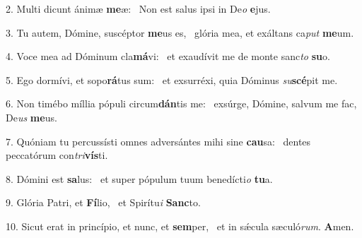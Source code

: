 2. Multi dicunt ánimæ \textbf{me}æ: \ast\  Non est salus ipsi in De\textit{o} \textbf{e}jus.\

3. Tu autem, Dómine, suscéptor \textbf{me}us es, \ast\  glória mea, et exáltans ca\textit{put} \textbf{me}um.\

4. Voce mea ad Dóminum cla\textbf{má}vi: \ast\  et exaudívit me de monte sanc\textit{to} \textbf{su}o.\

5. Ego dormívi, et sopo\textbf{rá}tus sum: \ast\  et exsurréxi, quia Dóminus \textit{su}\textbf{scé}pit me.\

6. Non timébo míllia pópuli circum\textbf{dán}tis me: \ast\  exsúrge, Dómine, salvum me fac, De\textit{us} \textbf{me}us.\

7. Quóniam tu percussísti omnes adversántes mihi sine \textbf{cau}sa: \ast\  dentes peccatórum con\textit{tri}\textbf{vís}ti.\

8. Dómini est \textbf{sa}lus: \ast\  et super pópulum tuum benedícti\textit{o} \textbf{tu}a.\

9. Glória Patri, et \textbf{Fí}lio, \ast\  et Spirítu\textit{i} \textbf{Sanc}to.\

10. Sicut erat in princípio, et nunc, et \textbf{sem}per, \ast\  et in sǽcula sæculó\textit{rum}. \textbf{A}men.\

